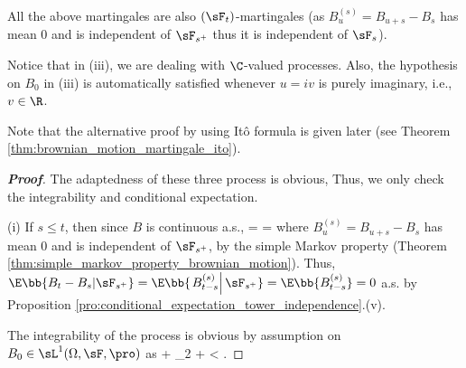 \begin{remark}
All the above martingales are also $(\sF_t)$-martingales (as $B^{(s)}_u = B_{u+s} -B_s$ has mean 0 and is independent of $\sF_{s^+}$ thus it is independent of $\sF_s$). %

Notice that in (iii), we are dealing with $\C$-valued processes. Also, the hypothesis on $B_0$ in (iii) is automatically satisfied whenever $u = iv$ is purely imaginary, i.e., $v \in \R$.

Note that the alternative proof by using It\^o formula is given later (see Theorem \ref{thm:brownian_motion_martingale_ito}).%
\end{remark}

\begin{proof}[\bf Proof]
The adaptedness of these three process is obvious, Thus, we only check the integrability and conditional expectation.
\ben
\item [(i)] If $s \leq t$, then since $B$ is continuous a.s.,
\be
\E{} = \E{} = \E{}
\ee
where $B^{(s)}_u = B_{u+s} -B_s$ has mean 0 and is independent of $\sF_{s^+}$, by the simple Markov property (Theorem \ref{thm:simple_markov_property_brownian_motion}). Thus, $\E\bb{B_t -B_s|\sF_{s^+}} = \E\bb{\left.B^{(s)}_{t-s}\right|\sF_{s^+}} = \E\bb{B^{(s)}_{t-s}} = 0$ a.s. by Proposition \ref{pro:conditional_expectation_tower_independence}.(v).

The integrability of the process is obvious by assumption on $B_0 \in \sL^1(\Omega,\sF,\pro)$ as
\be
\E{} \leq \E{} + \E{} \leq {}_2 + \E{} < \infty.
\ee


\end{proof}
